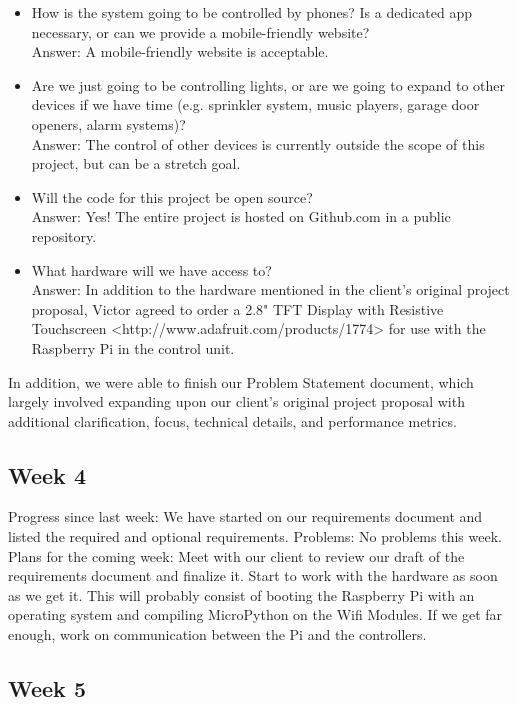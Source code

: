 \documentclass[letterpaper,10pt]{article}
\begin{document}
\begin{itemize}
    \item How is the system going to be controlled by phones?  Is a dedicated
        app necessary, or can we provide a mobile-friendly website?\\ Answer: A
        mobile-friendly website is acceptable.
    \item Are we just going to be controlling lights, or are we going to expand
        to other devices if we have time (e.g. sprinkler system, music players,
        garage door openers, alarm systems)?\\
        Answer: The control of other devices is currently outside the scope of
        this project, but can be a stretch goal.
    \item Will the code for this project be open source?\\
        Answer: Yes!  The entire project is hosted on Github.com in a public
        repository.
    \item What hardware will we have access to?\\
        Answer: In addition to the hardware mentioned in the client's original
        project proposal, Victor agreed to order a 2.8" TFT Display with
        Resistive Touchscreen <http://www.adafruit.com/products/1774> for use
        with the Raspberry Pi in the control unit.
\end{itemize}

In addition, we were able to finish our Problem Statement document, which
largely involved expanding upon our client's original project proposal with
additional clarification, focus, technical details, and performance metrics.

\subsection{Week 4}
 
Progress since last week: 
We have started on our requirements document and listed the required and optional requirements. 
Problems: 
No problems this week. 
Plans for the coming week: 
Meet with our client to review our draft of the requirements document and finalize it. 
Start to work with the hardware as soon as we get it. This will probably consist of booting the Raspberry Pi with an operating system and compiling MicroPython on the Wifi Modules. 
If we get far enough, work on communication between the Pi and the controllers. 

\subsection{Week 5}
\end{document}
